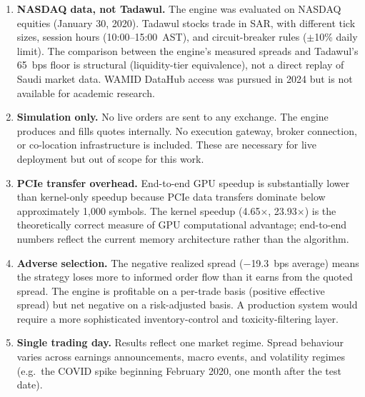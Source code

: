 \documentclass[12pt]{article}
\begin{document}
\begin{enumerate}
  \item \textbf{NASDAQ data, not Tadawul.} The engine was evaluated on
        NASDAQ equities (January 30, 2020). Tadawul stocks trade in SAR,
        with different tick sizes, session hours (10:00--15:00~AST), and
        circuit-breaker rules ($\pm$10\% daily limit). The comparison
        between the engine's measured spreads and Tadawul's 65~bps floor
        is structural (liquidity-tier equivalence), not a direct replay
        of Saudi market data. WAMID DataHub access was pursued in 2024
        but is not available for academic research.

  \item \textbf{Simulation only.} No live orders are sent to any
        exchange. The engine produces and fills quotes internally. No
        execution gateway, broker connection, or co-location
        infrastructure is included. These are necessary for live
        deployment but out of scope for this work.

  \item \textbf{PCIe transfer overhead.} End-to-end GPU speedup is
        substantially lower than kernel-only speedup because PCIe
        data transfers dominate below approximately 1,000 symbols.
        The kernel speedup (4.65$\times$, 23.93$\times$) is the
        theoretically correct measure of GPU computational advantage;
        end-to-end numbers reflect the current memory architecture
        rather than the algorithm.

  \item \textbf{Adverse selection.} The negative realized spread
        ($-$19.3~bps average) means the strategy loses more to informed
        order flow than it earns from the quoted spread. The engine is
        profitable on a per-trade basis (positive effective spread)
        but net negative on a risk-adjusted basis. A production system
        would require a more sophisticated inventory-control and
        toxicity-filtering layer.

  \item \textbf{Single trading day.} Results reflect one market
        regime. Spread behaviour varies across earnings announcements,
        macro events, and volatility regimes (e.g.\ the COVID spike
        beginning February 2020, one month after the test date).
\end{enumerate}

\end{document}
